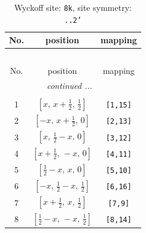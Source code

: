 \documentclass[fleqn,8pt]{jsarticle}
\begin{document}
\begin{longtable}{ccc}
\caption{Wyckoff site: {\tt 8k}, site symmetry: {\tt ..2'}}
 \\
 \hline \hline
No. & position & mapping \\ \hline \endfirsthead

\multicolumn{2}{l}{\tablename\ \thetable{}} \\
 \hline \hline
No. & position & mapping \\ \hline \endhead

 \hline \hline
\multicolumn{2}{r}{\footnotesize\it continued ...} \\ \endfoot

 \hline \hline
\multicolumn{2}{r}{} \\ \endlastfoot

1 & $\left[ x,\, x + \frac{1}{2},\, \frac{1}{2} \right]$ & {\tt [1,15]} \\ \hline
2 & $\left[ - x,\, x + \frac{1}{2},\, 0 \right]$ & {\tt [2,13]} \\ \hline
3 & $\left[ x,\, \frac{1}{2} - x,\, 0 \right]$ & {\tt [3,12]} \\ \hline
4 & $\left[ x + \frac{1}{2},\, - x,\, 0 \right]$ & {\tt [4,11]} \\ \hline
5 & $\left[ \frac{1}{2} - x,\, x,\, 0 \right]$ & {\tt [5,10]} \\ \hline
6 & $\left[ - x,\, \frac{1}{2} - x,\, \frac{1}{2} \right]$ & {\tt [6,16]} \\ \hline
7 & $\left[ x + \frac{1}{2},\, x,\, \frac{1}{2} \right]$ & {\tt [7,9]} \\ \hline
8 & $\left[ \frac{1}{2} - x,\, - x,\, \frac{1}{2} \right]$ & {\tt [8,14]} \\
\end{longtable}
\renewcommand{\arraystretch}{1.2}
\end{document}
